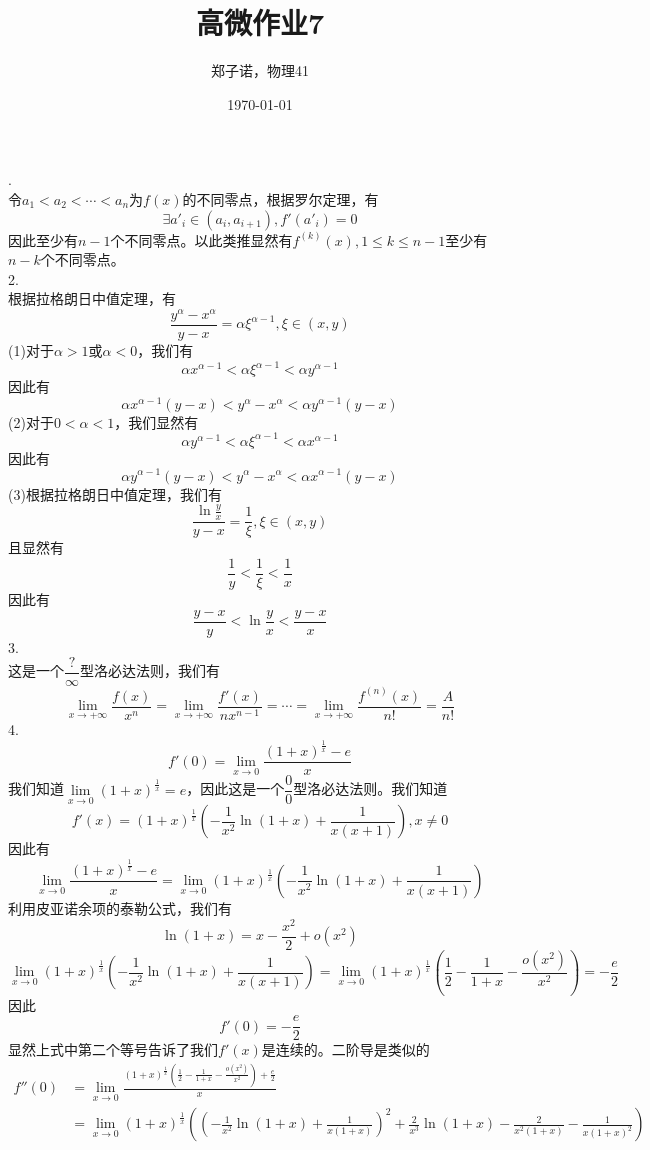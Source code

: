 \documentclass[utf8]{ctexart}
\title{高微作业7}
\author{郑子诺，物理41}
\date{\today}
\begin{document}
\maketitle
{}.\\
令$a_1<a_2<\cdots<a_n$为$f(x)$的不同零点，根据罗尔定理，有
\[\exists a'_i\in(a_i,a_{i+1}),f'(a'_i)=0\]
因此至少有$n-1$个不同零点。以此类推显然有$f^{(k)}(x),1\le k\le n-1$至少有$n-k$个不同零点。\\
2.\\
根据拉格朗日中值定理，有
\[\frac{y^\alpha-x^\alpha}{y-x}=\alpha\xi^{\alpha-1},\xi\in(x,y)\]
(1)对于$\alpha>1$或$\alpha<0$，我们有
\[\alpha x^{\alpha-1}<\alpha\xi^{\alpha-1}<\alpha y^{\alpha-1}\]
因此有
\[\alpha x^{\alpha-1}(y-x)<y^\alpha-x^\alpha<\alpha y^{\alpha-1}(y-x)\]
(2)对于$0<\alpha<1$，我们显然有
\[\alpha y^{\alpha-1}<\alpha\xi^{\alpha-1}<\alpha x^{\alpha-1}\]
因此有
\[\alpha y^{\alpha-1}(y-x)<y^\alpha-x^\alpha<\alpha x^{\alpha-1}(y-x)\]
(3)根据拉格朗日中值定理，我们有
\[\frac{\ln\frac{y}{x}}{y-x}=\frac{1}{\xi},\xi\in(x,y)\]
且显然有
\[\frac{1}{y}<\frac{1}{\xi}<\frac{1}{x}\]
因此有
\[\frac{y-x}{y}<\ln\frac{y}{x}<\frac{y-x}{x}\]
3.\\
这是一个$\dfrac{?}{\infty}$型洛必达法则，我们有
\[\lim\limits_{x\rightarrow+\infty}\frac{f(x)}{x^n}=\lim\limits_{x\rightarrow+\infty}\frac{f'(x)}{nx^{n-1}}=\cdots=\lim\limits_{x\rightarrow+\infty}\frac{f^{(n)}(x)}{n!}=\frac{A}{n!}\]
4.\\
\[f'(0)=\lim\limits_{x\rightarrow0}\frac{(1+x)^\frac{1}{x}-e}{x}\]
我们知道$\lim\limits_{x\rightarrow0}(1+x)^\frac{1}{x}=e$，因此这是一个$\dfrac{0}{0}$型洛必达法则。我们知道
\[f'(x)=(1+x)^\frac{1}{x}(-\frac{1}{x^2}\ln(1+x)+\frac{1}{x(x+1)}),x\neq0\]
因此有
\[\lim\limits_{x\rightarrow0}\frac{(1+x)^\frac{1}{x}-e}{x}=\lim\limits_{x\rightarrow0}(1+x)^\frac{1}{x}(-\frac{1}{x^2}\ln(1+x)+\frac{1}{x(x+1)})\]
利用皮亚诺余项的泰勒公式，我们有
\[\ln(1+x)=x-\frac{x^2}{2}+o(x^2)\]
\[\lim\limits_{x\rightarrow0}(1+x)^\frac{1}{x}(-\frac{1}{x^2}\ln(1+x)+\frac{1}{x(x+1)})=\lim\limits_{x\rightarrow0}(1+x)^\frac{1}{x}(\frac{1}{2}-\frac{1}{1+x}-\frac{o(x^2)}{x^2})=-\frac{e}{2}\]
因此
\[f'(0)=-\frac{e}{2}\]
显然上式中第二个等号告诉了我们$f'(x)$是连续的。二阶导是类似的
\begin{align*}
	f''(0)&=\lim\limits_{x\rightarrow0}\frac{(1+x)^\frac{1}{x}(\frac{1}{2}-\frac{1}{1+x}-\frac{o(x^2)}{x^2})+\frac{e}{2}}{x}\\
	&=\lim\limits_{x\rightarrow0}(1+x)^\frac{1}{x}((-\frac{1}{x^2}\ln(1+x)+\frac{1}{x(1+x)})^2+\frac{2}{x^3}\ln(1+x)-\frac{2}{x^2(1+x)}-\frac{1}{x(1+x)^2})
\end{align*}
\end{document}
